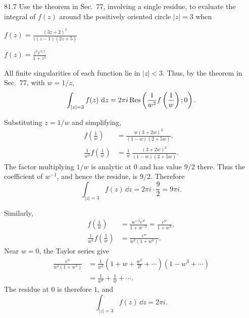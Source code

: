 \documentclass[11pt,oneside]{article}
\begin{document}
\begin{exercise}{81.7}
Use the theorem in Sec.~77, involving a single residue, to evaluate the integral of $f(z)$ around the positively oriented circle $|z|=3$ when
\begin{exercisesubparts}
    \item $\displaystyle f(z)=\frac{(3z+2)^2}{z(z-1)(2z+5)}$
    \item $\displaystyle f(z)=\frac{z^3e^{1/z}}{1+z^3}$
\end{exercisesubparts}
\end{exercise}

\begin{solution}
All finite singularities of each function lie in $|z|<3$. Thus, by the theorem in Sec.~77, with $w=1/z$,
\[
    \int_{|z|=3}f(z)\,\mathop{}\!\mathrm{d} z
      =2\pi i\operatorname{Res}\left(\frac1{w^2}f\left(\frac1w\right); 0\right).
\]
\begin{exercisesubparts}
    \item Substituting $z=1/w$ and simplifying,
    \[
    \begin{aligned}
        f\left(\frac1w\right)
        &=\frac{w(3+2w)^2}{(1-w)(2+5w)},\\
        \frac1{w^2}f\left(\frac1w\right)
        &=\frac1w\,\frac{(3+2w)^2}{(1-w)(2+5w)}.
    \end{aligned}
    \]
    The factor multiplying $1/w$ is analytic at $0$ and has value $9/2$ there. Thus the coefficient of $w^{-1}$, and hence the residue, is $9/2$. Therefore
    \[
        \boxed{\int_{|z|=3}f(z)\,\dd z
            =2\pi i\cdot\frac92=9\pi i.}
    \]

    \item Similarly,
    \[
    \begin{aligned}
        f\left(\frac1w\right)
        &=\frac{w^{-3}e^w}{1+w^{-3}}
         =\frac{e^w}{1+w^3},\\
        \frac1{w^2}f\left(\frac1w\right)
        &=\frac{e^w}{w^2(1+w^3)}.
    \end{aligned}
    \]
    Near $w=0$, the Taylor series give
    \[
    \begin{aligned}
        \frac{e^w}{w^2(1+w^3)}
        &=\frac1{w^2}\left(1+w+\frac{w^2}{2!}+\cdots\right)
          (1-w^3+\cdots)\\
        &=\frac1{w^2}+\frac1w+\cdots.
    \end{aligned}
    \]
    The residue at $0$ is therefore $1$, and
    \[
        \boxed{\int_{|z|=3}f(z)\,\dd z=2\pi i.}
    \]
\end{exercisesubparts}
\end{solution}
\end{document}
